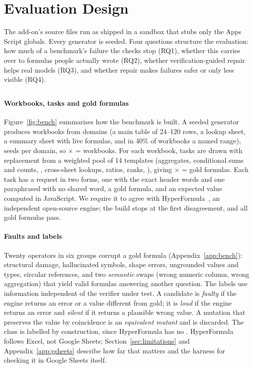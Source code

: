 \section{Evaluation Design}
\label{sec:method}

The add-on's source files run as shipped in a sandbox that stubs only the Apps Script globals. Every generator is seeded. Four questions structure the evaluation: how much of a benchmark's failure the checks stop (RQ1), whether this carries over to formulas people actually wrote (RQ2), whether verification-guided repair helps real models (RQ3), and whether repair makes failures safer or only less visible (RQ4).

\subsection{\sheetfault}
\label{sec:benchmark}

\paragraph{Workbooks, tasks and gold formulas}
Figure~\ref{fig:bench} summarises how the benchmark is built. A seeded generator produces workbooks from \accDomains{} domains (a main table of 24--120 rows, a lookup sheet, a summary sheet with live formulas, and in 40\% of workbooks a named range), \accSeeds{} seeds per domain, so \accDomains{} $\times$ \accSeeds{} = \accWorkbooks{} workbooks. For each workbook, \accTasksPerWb{} tasks are drawn with replacement from a weighted pool of 14 templates (aggregates, conditional sums and counts, , cross-sheet lookups, ratios, ranks, ), giving \accWorkbooks{} $\times$ \accTasksPerWb{} = \accGold{} gold formulas. Each task has a request in two forms, one with the exact header words and one paraphrased with no shared word, a gold formula, and an expected value computed in JavaScript. We require it to agree with HyperFormula~\cite{hyperformula}, an independent open-source engine; the build stops at the first disagreement, and all \nBenchGold{} gold formulas pass.

\paragraph{Faults and labels}
Twenty operators in six groups corrupt a gold formula (Appendix~\ref{app:bench}): structural damage, hallucinated symbols, shape errors, ungrounded values and types, circular references, and two \emph{semantic} swaps (wrong numeric column, wrong aggregation) that yield valid formulas answering another question. The labels use information independent of the verifier under test. A candidate is \emph{faulty} if the engine returns an error or a value different from gold; it is \emph{loud} if the engine returns an error and \emph{silent} if it returns a plausible wrong value. A mutation that preserves the value by coincidence is an \emph{equivalent mutant} and is discarded. The  class is labelled by construction, since HyperFormula has no . HyperFormula follows Excel, not Google Sheets; Section~\ref{sec:limitations} and Appendix~\ref{app:gsheets} describe how far that matters and the harness for checking it in Google Sheets itself.


